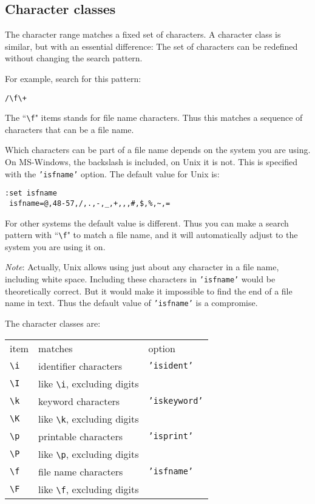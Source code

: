 \subsection{Character classes}
The character range matches a fixed set of characters.
A character class is similar, but with an essential difference: The set of characters can be redefined without changing the search pattern.

For example, search for this pattern:

\begin{Verbatim}[samepage=true]
 /\f\+
\end{Verbatim}

The ``\texttt{\textbackslash{}f}" items stands for file name characters.
Thus this matches a sequence of characters that can be a file name.

Which characters can be part of a file name depends on the system you are using.
On MS-Windows, the backslash is included, on Unix it is not.
This is specified with the \texttt{'isfname'} option.
The default value for Unix is:

\begin{Verbatim}[samepage=true]
 :set isfname
 isfname=@,48-57,/,.,-,_,+,,,#,$,%,~,=
\end{Verbatim}

For other systems the default value is different.
Thus you can make a search pattern with ``\texttt{\textbackslash{}f}" to match a file name, and it will automatically adjust to the system you are using it on.

\emph{Note}: Actually, Unix allows using just about any character in a file name, including white space.
Including these characters in \texttt{'isfname'} would be theoretically correct.
But it would make it impossible to find the end of a file name in text.
Thus the default value of \texttt{'isfname'} is a compromise.

The character classes are:

\begin{center} \begin{tabular}{l l l}
				item & matches & option \\
				\texttt{\textbackslash{}i} & identifier characters & \texttt{'isident'} \\
				\texttt{\textbackslash{}I} & like \texttt{\textbackslash{}i}, excluding digits & \\
				\texttt{\textbackslash{}k} & keyword characters & \texttt{'iskeyword'} \\
				\texttt{\textbackslash{}K} & like \texttt{\textbackslash{}k}, excluding digits & \\
				\texttt{\textbackslash{}p} & printable characters & \texttt{'isprint'} \\
				\texttt{\textbackslash{}P} & like \texttt{\textbackslash{}p}, excluding digits & \\
				\texttt{\textbackslash{}f} & file name characters & \texttt{'isfname'} \\
				\texttt{\textbackslash{}F} & like \texttt{\textbackslash{}f}, excluding digits & \\
\end{tabular} \end{center}

